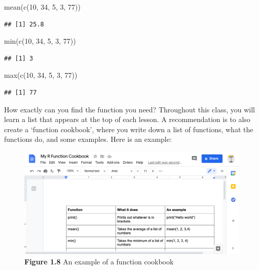 \documentclass[
]{book}
\newenvironment{Shaded}{\begin{snugshade}}{\end{snugshade}}
\newcommand{\DecValTok}[1]{\textcolor[rgb]{0.00,0.00,0.81}{#1}}
\newcommand{\FunctionTok}[1]{\textcolor[rgb]{0.00,0.00,0.00}{#1}}
\newcommand{\NormalTok}[1]{#1}
\begin{document}
\begin{Shaded}
\begin{Highlighting}[]
\FunctionTok{mean}\NormalTok{(}\FunctionTok{c}\NormalTok{(}\DecValTok{10}\NormalTok{, }\DecValTok{34}\NormalTok{, }\DecValTok{5}\NormalTok{, }\DecValTok{3}\NormalTok{, }\DecValTok{77}\NormalTok{))}
\end{Highlighting}
\end{Shaded}

\begin{verbatim}
## [1] 25.8
\end{verbatim}

\begin{Shaded}
\begin{Highlighting}[]
\FunctionTok{min}\NormalTok{(}\FunctionTok{c}\NormalTok{(}\DecValTok{10}\NormalTok{, }\DecValTok{34}\NormalTok{, }\DecValTok{5}\NormalTok{, }\DecValTok{3}\NormalTok{, }\DecValTok{77}\NormalTok{))}
\end{Highlighting}
\end{Shaded}

\begin{verbatim}
## [1] 3
\end{verbatim}

\begin{Shaded}
\begin{Highlighting}[]
\FunctionTok{max}\NormalTok{(}\FunctionTok{c}\NormalTok{(}\DecValTok{10}\NormalTok{, }\DecValTok{34}\NormalTok{, }\DecValTok{5}\NormalTok{, }\DecValTok{3}\NormalTok{, }\DecValTok{77}\NormalTok{))}
\end{Highlighting}
\end{Shaded}

\begin{verbatim}
## [1] 77
\end{verbatim}

How exactly can you find the function you need? Throughout this class, you will learn a list that appears at the top of each lesson. A recommendation is to also create a `function cookbook', where you write down a list of functions, what the functions do, and some examples. Here is an example:

\begin{figure}
\centering
\includegraphics{Images/fn_cookbook.png}
\caption{\textbf{Figure 1.8} An example of a function cookbook}
\end{figure}
\end{document}
